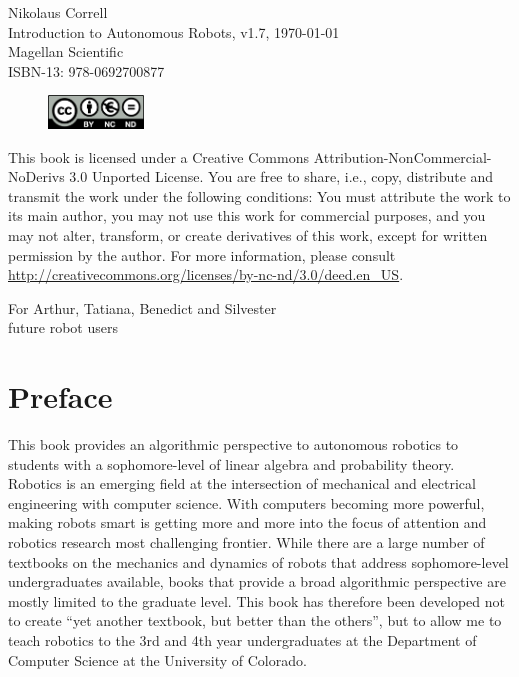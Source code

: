 \documentclass[paper=6.14in:9.21in,pagesize=pdftex,11pt,twoside,openright]{scrbook}
\begin{document}

\thispagestyle{empty}
\begin{flushleft}
Nikolaus Correll\\
Introduction to Autonomous Robots, v1.7, \today\\
Magellan Scientific\\
ISBN-13: 978-0692700877
\end{flushleft}

\vfill

\begin{figure}[!h]
\includegraphics[width=1in]{figs/by-nc-nd}
\end{figure}

This book is licensed under a Creative Commons Attribution-NonCommercial-NoDerivs 3.0 Unported License. You are free to share, i.e., copy, distribute and transmit the work under the following conditions: You must attribute the work to its main author, you may not use this work for commercial purposes, and you may not alter, transform, or create derivatives of this work, except for written permission by the author. For more information, please consult \url{http://creativecommons.org/licenses/by-nc-nd/3.0/deed.en_US}.


\cleardoublepage
\thispagestyle{empty}
\vspace*{\fill}
\begin{center}
For Arthur, Tatiana, Benedict and Silvester\\
future robot users
\end{center}
\vspace*{\fill}

\tableofcontents

\chapter*{Preface}
This book provides an algorithmic perspective to autonomous robotics to students with a sophomore-level of linear algebra and probability theory. Robotics is an emerging field at the intersection of mechanical and electrical engineering with computer science. With computers becoming more powerful, making robots smart is getting more and more into the focus of attention and robotics research most challenging frontier. While there are a large number of textbooks on the mechanics and dynamics of robots that address sophomore-level undergraduates available, books that provide a broad algorithmic perspective are mostly limited to the graduate level. This book has therefore been developed not to create ``yet another textbook, but better than the others'', but to allow me to teach robotics to the 3rd and 4th year undergraduates at the Department of Computer Science at the University of Colorado. 
\end{document}
